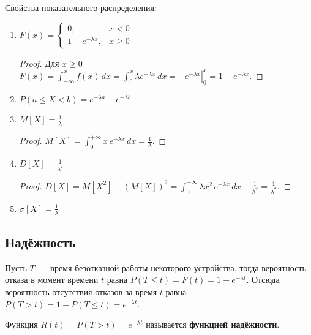 Свойства показательного распределения:
\begin{enumerate}
	\item $\displaystyle F(x) =
	\begin{cases}
	0, & x < 0 \\
	1 - e^{-\lambda x}, & x \geqslant 0
	\end{cases}$
	\begin{proof}
	Для $x \geqslant 0$
	$\displaystyle F(x) =
	\int_{-\infty}^x f(x)\,dx =
	\int_0^x \lambda e^{-\lambda x}\,dx =
	\left. -e^{-\lambda x} \right|_0^x =
	1 - e^{-\lambda x}$.
	\end{proof}
	
	\item $\displaystyle P(a \leqslant X < b) = e^{-\lambda a} - e^{-\lambda b}$
	
	\item $\displaystyle M[X] = \frac1\lambda$
	\begin{proof}
	$\displaystyle M[X] =
	\int_0^{+\infty} x\,e^{-\lambda x}\,dx =
	\frac1\lambda$.
	\end{proof}
	
	\item $\displaystyle D[X] = \frac1{\lambda^2}$
	\begin{proof}
	$\displaystyle D[X] =
	M[X^2] - (M[X])^2 =
	\int_0^{+\infty} \lambda x^2\,e^{-\lambda x}\,dx - \frac1{\lambda^2} =
	\frac1{\lambda^2}$.
	\end{proof}
	
	\item $\displaystyle \sigma[X] = \frac1\lambda$
\end{enumerate}

\subsection{Надёжность}
Пусть $T$~--- время безотказной работы некоторого устройства, тогда вероятность отказа в момент времени $t$ равна $P(T \leqslant t) = F(t) = 1 - e^{-\lambda t}$.
Отсюда вероятность отсутствия отказов за время $t$ равна $P(T > t) = 1 - P(T \leqslant t) = e^{-\lambda t}$.

 Функция $R(t) = P(T > t) = e^{-\lambda t}$ называется \textbf{функцией надёжности}.